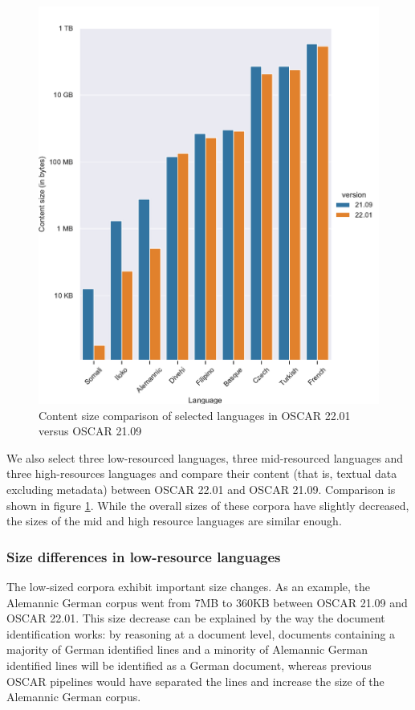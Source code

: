 \begin{figure}[!ht]
    \begin{center}
        \includegraphics[scale=0.50]{static/media/oscar/towards/size_comp_content}
        \caption{Content size comparison of selected languages in OSCAR 22.01 versus OSCAR 21.09}
        \label{fig.2}
    \end{center}
\end{figure}

We also select three low-resourced languages, three mid-resourced languages and three high-resources languages and compare their content (that is, textual data excluding metadata) between OSCAR 22.01 and OSCAR 21.09. Comparison is shown in figure \ref{fig.2}. While the overall sizes of these corpora  have slightly decreased, the sizes of the mid and high resource languages are similar enough.

\subsubsection{Size differences in low-resource languages}

The low-sized corpora exhibit important size changes. As an example, the Alemannic German corpus went from 7MB to 360KB between OSCAR 21.09 and OSCAR 22.01. This size decrease can be explained by the way the document identification works: by reasoning at a document level, documents containing a majority of German identified lines and a minority of Alemannic German identified lines will be identified as a German document, whereas previous OSCAR pipelines would have separated the lines and increase the size of the Alemannic German corpus.

